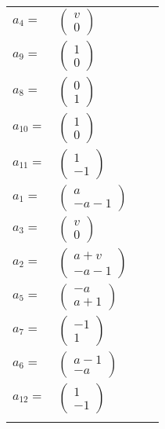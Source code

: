 \documentclass[1p]{elsarticle_modified}
\theoremstyle{definition}
\begin{document}
\begin{tabular}{m{7pt} m{180pt} m{7pt} m{180pt} }
\flushright $a_{4}=$&$\begin{pmatrix}v\\0\end{pmatrix}$ \\
\flushright $a_{9}=$&$\begin{pmatrix}1\\0\end{pmatrix}$ \\
\flushright $a_{8}=$&$\begin{pmatrix}0\\1\end{pmatrix}$ \\
\flushright $a_{10}=$&$\begin{pmatrix}1\\0\end{pmatrix}$ \\
\flushright $a_{11}=$&$\begin{pmatrix}1\\-1\end{pmatrix}$ \\
\flushright $a_{1}=$&$\begin{pmatrix}a\\- a-1\end{pmatrix}$ \\
\flushright $a_{3}=$&$\begin{pmatrix}v\\0\end{pmatrix}$ \\
\flushright $a_{2}=$&$\begin{pmatrix}a+v\\- a-1\end{pmatrix}$ \\
\flushright $a_{5}=$&$\begin{pmatrix}- a\\a+1\end{pmatrix}$ \\
\flushright $a_{7}=$&$\begin{pmatrix}-1\\1\end{pmatrix}$ \\
\flushright $a_{6}=$&$\begin{pmatrix}a-1\\- a\end{pmatrix}$ \\
\flushright $a_{12}=$&$\begin{pmatrix}1\\-1\end{pmatrix}$\\&\end{tabular}
\end{document}
